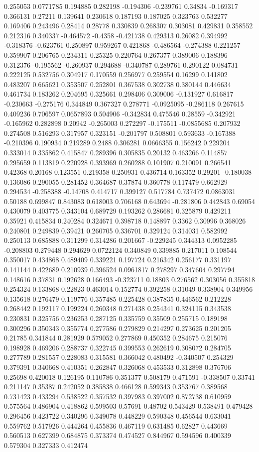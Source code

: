 0.255053 0.0771785 0.194885 0.282198 -0.194306 -0.239761 0.34834 -0.169317 0.366131 0.27211 0.139641 0.230618 0.187193 0.187025 0.323763 0.532277 0.169406 0.243496 0.28414 0.28778 0.330839 0.268307 0.303081 0.429831 0.358552 0.212316 0.340337 -0.464572 -0.4358 -0.421738 0.429313 0.26082 0.394992 -0.318376 -0.623761 0.250897 0.959267 0.421868 -0.486564 -0.274388 0.221257 0.359907 0.206765 0.234311 0.25325 0.220764 0.267377 0.389006 0.188396 0.312376 -0.195562 -0.260937 0.294688 -0.340787 0.289761 0.290122 0.084731 0.222125 0.532756 0.304917 0.170559 0.256977 0.259554 0.16299 0.141802 0.483207 0.665621 0.353507 0.252801 0.367538 0.302738 0.380144 0.446634 0.461734 0.183262 0.204695 0.325661 0.298406 0.309006 -0.131927 0.616817 -0.230663 -0.275176 0.344849 0.367327 0.278771 -0.0925095 -0.286118 0.267615 0.409236 0.706597 0.0657893 0.504906 -0.342834 0.475546 0.28559 -0.342921 -0.165962 0.282898 0.20942 -0.265003 0.272297 -0.175511 -0.0855685 0.207932 0.274508 0.516293 0.317957 0.323151 -0.201797 0.508801 0.593633 -0.167388 -0.210396 0.190934 0.219289 0.2488 0.306281 0.0666355 0.156242 0.229204 0.333014 0.335862 0.415847 0.289396 0.305835 0.20132 0.463266 0.114857 0.295659 0.113819 0.220928 0.393969 0.260288 0.101907 0.210091 0.266541 0.42368 0.20168 0.123551 0.219358 0.250931 0.436714 0.163352 0.29201 -0.180038 0.136086 0.290055 0.281452 0.364687 0.37874 0.360778 0.117479 0.662929 0.294534 -0.258388 -0.14708 0.414717 0.399127 0.517784 0.737472 0.0863031 0.50188 0.699847 0.843083 0.618003 0.706168 0.643694 -0.281806 0.442843 0.69054 0.430079 0.403775 0.343104 0.689729 0.193262 0.286681 0.325879 0.429211 0.35921 0.415834 0.240284 0.324671 0.398718 0.148897 0.3362 0.30996 0.368026 0.240801 0.249839 0.39421 0.260705 0.336701 0.329124 0.314031 0.582992 0.250113 0.685888 0.311299 0.314286 0.201667 -0.229245 0.344313 0.0952285 -0.208803 0.279448 0.294629 0.0722124 0.340849 0.339885 0.217011 0.108544 0.350017 0.434868 0.489409 0.339221 0.197724 0.216342 0.256177 0.331197 0.141144 0.422689 0.210939 0.396524 0.0961817 0.278297 0.347604 0.297794 0.148616 0.37831 0.192628 0.166493 -0.323711 0.18803 0.276562 0.303056 0.355818 0.254324 0.133868 0.22823 0.463014 0.152774 0.392258 0.31049 0.338904 0.349956 0.135618 0.276479 0.119776 0.357485 0.225428 0.387835 0.446562 0.212228 0.268442 0.192117 0.199224 0.260348 0.271438 0.254341 0.324115 0.343538 0.230831 0.325756 0.236253 0.287125 0.335759 0.35509 0.255715 0.189198 0.300296 0.350343 0.355774 0.277586 0.279829 0.214297 0.273625 0.201205 0.21785 0.341844 0.281929 0.579052 0.277869 0.450352 0.284675 0.215076 0.198928 0.469206 0.288737 0.322745 0.399553 0.262619 0.308072 0.284705 0.277789 0.281557 0.228083 0.315581 0.366042 0.480492 -0.340507 0.254329 0.379391 0.340668 0.410351 0.262847 0.326068 0.453533 0.312898 0.376706 0.25698 0.420018 0.126195 0.110786 0.351377 0.508179 0.471591 -0.338507 0.33741 0.211147 0.35387 0.242052 0.385838 0.466128 0.599343 0.353767 0.389568 0.731423 0.433294 0.538522 0.357532 0.397983 0.397002 0.872738 0.610959 0.575564 0.486904 0.418862 0.599503 0.57691 0.48702 0.543429 0.538491 0.479428 0.296456 0.423722 0.340296 0.349078 0.448229 0.590348 0.456544 0.633041 0.559762 0.517926 0.444264 0.455836 0.467119 0.631485 0.62827 0.443669 0.560513 0.627399 0.684875 0.373374 0.474527 0.844967 0.594596 0.400339 0.579304 0.327333 0.412474 